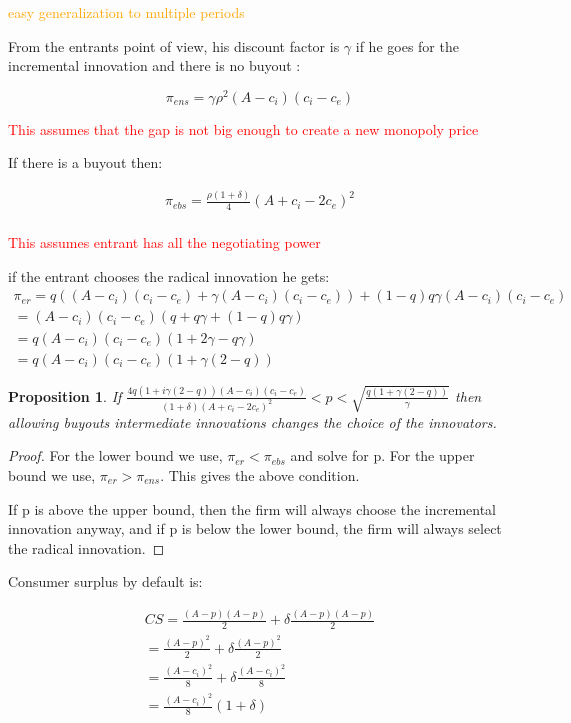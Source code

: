 \documentclass{article}
\newtheorem{proposition}{Proposition}
\begin{document}
\textcolor{orange}{easy generalization to multiple periods}

From the entrants point of view, his discount factor is $\gamma$ if he goes for the incremental innovation and there is no buyout :

\begin{equation*}
\pi_{ens} = \gamma \rho^2 (A-c_i)(c_i-c_e) 
\end{equation*}

\textcolor{red}{This assumes that the gap is not big enough to create a new monopoly price}

If there is a buyout then:

\begin{align*}
\pi_{ebs} = \frac{\rho (1+\delta)}{4}\left(A+c_i-2c_e \right)^2  \\
\end{align*}

\textcolor{red}{This assumes entrant has all the negotiating power}

if the entrant chooses the radical innovation he gets:
\begin{align*}
\pi_{er} =
q((A-c_i)(c_i-c_e)+\gamma (A-c_i)(c_i-c_e)) 
+ (1-q)q \gamma (A-c_i)(c_i-c_e) \\
= (A-c_i)(c_i-c_e)(q + q \gamma + (1-q)q \gamma) \\
= q(A-c_i)(c_i-c_e)(1 +  2 \gamma - q \gamma) \\
= q(A-c_i)(c_i-c_e)(1 +  \gamma(2  - q))
\end{align*}

\begin{proposition}
If $\frac{4q(1+i\gamma(2-q))(A-c_i)(c_i-c_e)}{(1+\delta)(A+c_i-2c_e)^2}<p<\sqrt{\frac{q(1+\gamma(2-q))}{\gamma}}$ then allowing buyouts intermediate innovations changes the choice of the innovators. 
\end{proposition}

\begin{proof}
For the lower bound we use, $\pi_{er}<\pi_{ebs}$ and solve for p. For the upper bound we use, $\pi_{er}>\pi_{ens}$. This gives the above condition. 

If p is above the upper bound, then the firm will always choose the incremental innovation anyway, and if p is below the lower bound, the firm will always select the radical innovation. 
\end{proof}

Consumer surplus by default is:

\begin{align*}
CS=\frac{(A-p)(A-p)}{2}+\delta\frac{(A-p)(A-p)}{2} \\
=\frac{(A-p)^2}{2}+\delta\frac{(A-p)^2}{2} \\
=\frac{(A-c_i)^2}{8}+\delta\frac{(A-c_i)^2}{8} \\
= \frac{(A-c_i)^2}{8}(1+\delta)
\end{align*}
\end{document}
